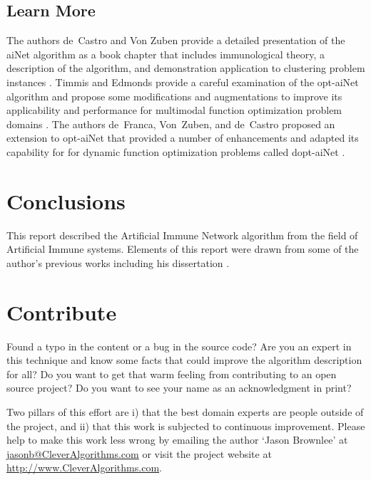 \documentclass[a4paper, 11pt]{article}
\makeatletter
\newcommand{\myreportauthor}{Jason Brownlee}
\newcommand{\myreportemail}{jasonb@CleverAlgorithms.com}
\newcommand{\myreportwebsite}{http://www.CleverAlgorithms.com}
\makeatother
\begin{document}
% 
% 
\subsection{Learn More}
The authors de~Castro and Von Zuben provide a detailed presentation of the aiNet algorithm as a book chapter that includes immunological theory, a description of the algorithm, and demonstration application to clustering problem instances \cite{Castro2001}.
Timmis and Edmonds provide a careful examination of the opt-aiNet algorithm and propose some modifications and augmentations to improve its applicability and performance for multimodal function optimization problem domains \cite{Timmis2004}.
The authors de~Franca, Von~Zuben, and de~Castro proposed an extension to opt-aiNet that provided a number of enhancements and adapted its capability for for dynamic function optimization problems called dopt-aiNet \cite{Franca2005}.


% 
% 
\section{Conclusions}
\label{sec:conclusions}
This report described the Artificial Immune Network algorithm from the field of Artificial Immune systems.
Elements of this report were drawn from some of the author's previous works including his dissertation \cite{Brownlee2008}.

% 
% 
\section{Contribute}
\label{sec:contribute}
Found a typo in the content or a bug in the source code? 
Are you an expert in this technique and know some facts that could improve the algorithm description for all?
Do you want to get that warm feeling from contributing to an open source project? 
Do you want to see your name as an acknowledgment in print?

Two pillars of this effort are i) that the best domain experts are people outside of the project, and ii) that this work is subjected to continuous improvement. 
Please help to make this work less wrong by emailing the author `\myreportauthor' at \url{\myreportemail} or visit the project website at \url{\myreportwebsite}.



\end{document}
